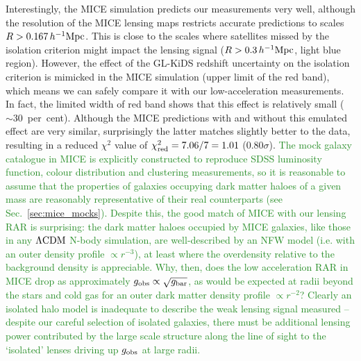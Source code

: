 \documentclass[usenatbib]{mnras}
\newcommand{\hMpc}{\, h^{-1}{\rm{Mpc}} }
\newcommand{\lcdm}{{\rm \Lambda CDM}}
\newcommand{\un}[1]{_{\rm #1}}
\begin{document}
Interestingly, the MICE simulation predicts our measurements very well, although the resolution of the MICE lensing maps restricts accurate predictions to scales $R > 0.167 \hMpc$. This is close to the scales where satellites missed by the isolation criterion might impact the lensing signal ($R > 0.3 \hMpc$, light blue region). However, the effect of the GL-KiDS redshift uncertainty on the isolation criterion is mimicked in the MICE simulation (upper limit of the red band), which means we can safely compare it with our low-acceleration measurements. In fact, the limited width of red band shows that this effect is relatively small ($\sim 30$~per~cent). Although the MICE predictions with and without this emulated effect are very similar, surprisingly the latter matches slightly better to the data, resulting in a reduced $\chi^2$ value of $\chi\un{red}^2 = 7.06 / 7 = 1.01$ ($0.80 \sigma$). \textcolor{ForestGreen}{The mock galaxy catalogue in MICE is explicitly constructed to reproduce SDSS luminosity function, colour distribution and clustering measurements, so it is reasonable to assume that the properties of galaxies occupying dark matter haloes of a given mass are reasonably representative of their real counterparts (see Sec.~\ref{sec:mice_mocks}). Despite this, the good match of MICE with our lensing RAR is surprising: the dark matter haloes occupied by MICE galaxies, like those in any $\lcdm$ N-body simulation, are well-described by an NFW model (i.e. with an outer density profile $\propto r^{-3}$), at least where the overdensity relative to the background density is appreciable. Why, then, does the low acceleration RAR in MICE drop as approximately $g\un{obs}\propto\sqrt{g\un{bar}}$, as would be expected at radii beyond the stars and cold gas for an outer dark matter density profile $\propto r^{-2}$? Clearly an isolated halo model is inadequate to describe the weak lensing signal measured -- despite our careful selection of isolated galaxies, there must be additional lensing power contributed by the large scale structure along the line of sight to the `isolated' lenses driving up $g_{\rm obs}$ at large radii.}
\end{document}
